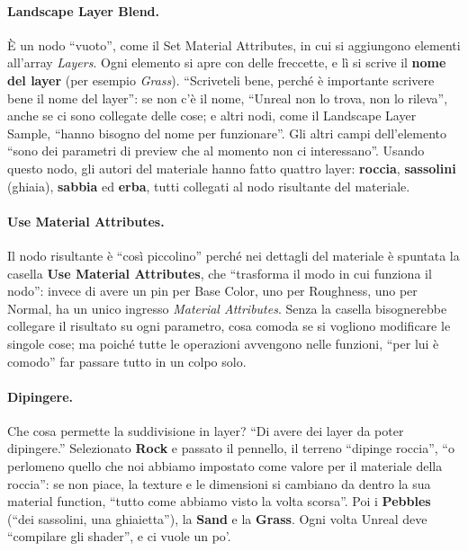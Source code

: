 \paragraph{Landscape Layer Blend.} È un nodo ``vuoto'', come il Set Material Attributes, in
cui si aggiungono elementi all'array \emph{Layers}. Ogni elemento si apre con delle
freccette, e lì si scrive il \textbf{nome del layer} (per esempio \emph{Grass}).
``Scriveteli bene, perché è importante scrivere bene il nome del layer'': se non c'è il
nome, ``Unreal non lo trova, non lo rileva'', anche se ci sono collegate delle cose; e altri
nodi, come il Landscape Layer Sample, ``hanno bisogno del nome per funzionare''. Gli altri
campi dell'elemento ``sono dei parametri di preview che al momento non ci interessano''.
Usando questo nodo, gli autori del materiale hanno fatto quattro layer: \textbf{roccia},
\textbf{sassolini} (ghiaia), \textbf{sabbia} ed \textbf{erba}, tutti collegati al nodo
risultante del materiale.

\paragraph{Use Material Attributes.} Il nodo risultante è ``così piccolino'' perché nei
dettagli del materiale è spuntata la casella \textbf{Use Material Attributes}, che
``trasforma il modo in cui funziona il nodo'': invece di avere un pin per Base Color, uno per
Roughness, uno per Normal, ha un unico ingresso \emph{Material Attributes}. Senza la casella
bisognerebbe collegare il risultato su ogni parametro, cosa comoda se si vogliono
modificare le singole cose; ma poiché tutte le operazioni avvengono nelle funzioni, ``per
lui è comodo'' far passare tutto in un colpo solo.

\paragraph{Dipingere.} Che cosa permette la suddivisione in layer? ``Di avere dei layer da
poter dipingere.'' Selezionato \textbf{Rock} e passato il pennello, il terreno ``dipinge
roccia'', ``o perlomeno quello che noi abbiamo impostato come valore per il materiale della
roccia'': se non piace, la texture e le dimensioni si cambiano da dentro la sua material
function, ``tutto come abbiamo visto la volta scorsa''. Poi i \textbf{Pebbles} (``dei
sassolini, una ghiaietta''), la \textbf{Sand} e la \textbf{Grass}. Ogni volta Unreal deve
``compilare gli shader'', e ci vuole un po'.

